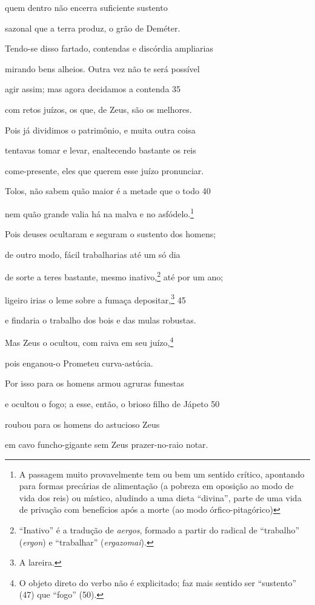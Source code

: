 quem dentro não encerra suficiente sustento

sazonal que a terra produz, o grão de Deméter.

Tendo-se disso fartado, contendas e discórdia ampliarias

mirando bens alheios. Outra vez não te será possível

agir assim; mas agora decidamos a contenda \num{35}

com retos juízos, os que, de Zeus, são os melhores.

Pois já dividimos o patrimônio, e muita outra coisa

tentavas tomar e levar, enaltecendo bastante os reis

come-presente, eles que querem esse juízo pronunciar.

Tolos, não sabem quão maior é a metade que o todo \num{40}

nem quão grande valia há na malva e no asfódelo.\footnote{A passagem muito provavelmente tem ou bem um sentido crítico,
apontando para formas precárias de alimentação (a pobreza em oposição ao
modo de vida dos reis) ou místico, aludindo a uma dieta ``divina'',
parte de uma vida de privação com benefícios após a morte (ao modo
órfico-pitagórico)}

Pois deuses ocultaram e seguram o sustento dos homens;

de outro modo, fácil trabalharias até um só dia

de sorte a teres bastante, mesmo inativo,\footnote{``Inativo'' é a tradução de \emph{aergos}, formado a partir do radical de ``trabalho'' (\emph{ergon}) e ``trabalhar'' (\emph{ergazomai}).} até por um ano;

ligeiro irias o leme sobre a fumaça depositar,\footnote{A lareira.} \num{45}

e findaria o trabalho dos bois e das mulas robustas.

Mas Zeus o ocultou, com raiva em seu juízo,\footnote{O objeto direto do verbo não é explicitado; faz mais sentido ser ``sustento'' (47) que ``fogo'' (50).}

pois enganou-o Prometeu curva-astúcia.

Por isso para os homens armou agruras funestas

e ocultou o fogo; a esse, então, o brioso filho de Jápeto \num{50}

roubou para os homens do astucioso Zeus

em cavo funcho-gigante sem Zeus prazer-no-raio notar.

